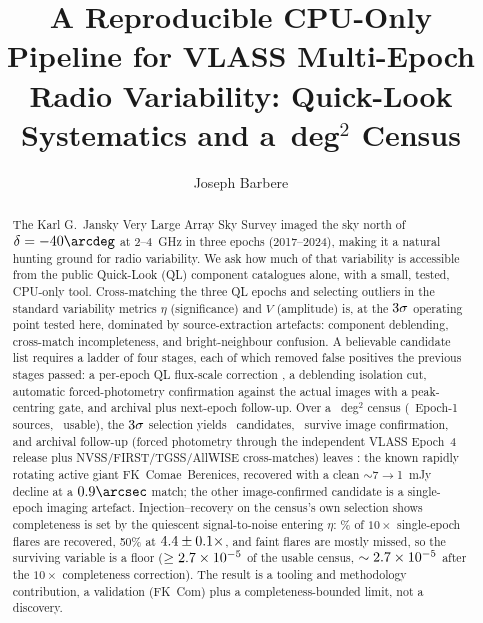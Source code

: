\documentclass[twocolumn]{aastex631}
\begin{document}
\title{A Reproducible CPU-Only Pipeline for VLASS Multi-Epoch Radio Variability:
Quick-Look Systematics and a \vlassRealArea\,deg$^2$ Census}

\author[0009-0008-3289-4447]{Joseph Barbere}

\begin{abstract}
The Karl G.\ Jansky Very Large Array Sky Survey \citep[VLASS;][]{lacy2020} imaged the sky north of
$\delta=-40\arcdeg$ at 2--4~GHz in three epochs (2017--2024), making it a natural hunting ground for
radio variability. We ask how much of that variability is accessible from the public Quick-Look (QL)
component catalogues alone, with a small, tested, CPU-only tool. Cross-matching the three QL epochs
and selecting outliers in the standard variability metrics $\eta$ (significance) and $V$ (amplitude)
is, at the $3\sigma$ operating point tested here, dominated by source-extraction
artefacts: component deblending, cross-match incompleteness, and bright-neighbour confusion. A
believable candidate list requires a ladder of four stages, each of which removed false positives
the previous stages passed: a per-epoch QL flux-scale correction \citep{vlassmemo13, vlassmemo22},
a deblending isolation cut, automatic forced-photometry confirmation against the actual images with
a peak-centring gate, and archival plus next-epoch follow-up. Over a \vlassRealArea~deg$^2$ census
(\vlassRealNsources\ Epoch-1 sources, \vlassRealNusable\ usable), the $3\sigma$ selection
yields \vlassRealNcand\ candidates, \vlassRealNconfirmed\ survive image confirmation, and archival
follow-up (forced photometry through the independent VLASS Epoch~4 release plus
NVSS/FIRST/TGSS/AllWISE cross-matches) leaves \vlassRealNarchival: the known rapidly rotating
active giant FK~Comae~Berenices, recovered with a clean $\sim$7$\to$1~mJy decline at a
$0.9\arcsec$ match; the other image-confirmed candidate is a single-epoch imaging artefact.
Injection--recovery on the census's own selection shows completeness is set by the quiescent
signal-to-noise entering $\eta$: \vlassRealComplTen\% of $10\times$ single-epoch flares are
recovered, 50\% at $4.4\pm0.1\times$, and faint flares are
mostly missed, so the surviving variable is a floor ($\ge2.7\times10^{-5}$ of the usable census,
$\sim2.7\times10^{-5}$ after the $10\times$ completeness correction). The result is a tooling
and methodology contribution, a validation (FK~Com) plus a completeness-bounded limit, not a
discovery.
\end{abstract}
\end{document}
